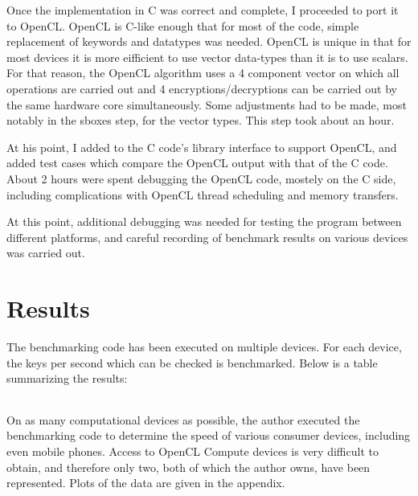\documentclass[12pt]{article}
\begin{document}
Once the implementation in C was correct and complete, I proceeded to port it to OpenCL. OpenCL is C-like enough that for most of the code, simple replacement of keywords and datatypes was needed. OpenCL is unique in that for most devices it is more eifficient to use vector data-types than it is to use scalars. For that reason, the OpenCL algorithm uses a 4 component vector on which all operations are carried out and 4 encryptions/decryptions can be carried out by the same hardware core simultaneously. Some adjustments had to be made, most notably in the sboxes step, for the vector types. This step took about an hour.

At his point, I added to the C code's library interface to support OpenCL, and added test cases which compare the OpenCL output with that of the C code. About 2 hours were spent debugging the OpenCL code, mostely on the C side, including complications with OpenCL thread scheduling and memory transfers.

At this point, additional debugging was needed for testing the program between different platforms, and careful recording of benchmark results on various devices was carried out.


\section{Results}
The benchmarking code has been executed on multiple devices. For each device, the keys per second which can be checked is benchmarked. Below is a table summarizing the results:
\begin{savenotes}
\begin{table}[h]
\tiny
\begin{adjustwidth}{-5in}{-5in}
\centering
\begin{tabular}{|l|c|c|c|c|r|r|r|}
\hline

\end{tabular}
\label{tab:myfirsttable}
\end{adjustwidth}
\end{table}
\end{savenotes}

On as many computational devices as possible, the author executed the benchmarking code to determine the speed of various consumer devices, including even mobile phones. Access to OpenCL Compute devices is very difficult to obtain, and therefore only two, both of which the author owns, have been represented. Plots of the data are given in the appendix.
\end{document}
